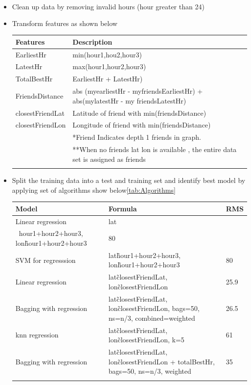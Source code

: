 \begin{itemize}
\item Clean up data by removing invalid hours (hour  greater than 24)
\item Transform features as shown below

\begin{footnotesize}
\begin{tabular}{ll}

\toprule
Features & Description \\
\midrule
EarliestHr & min(hour1,hou2,hour3) \\
LatestHr & max(hour1,hour2,hour3) \\
TotalBestHr & EarliestHr + LatestHr) \\
FriendsDistance & abs (myearliestHr - myfriendsEarliestHr) +  abs(mylatestHr - my friendsLatestHr) \\
closestFriendLat & Latitude of friend with min(friendsDistance) \\
closestFriendLon & Longitude of friend with min(friendsDistance) \\
\midrule
 & \tiny{*Friend Indicates depth 1 friends in graph.}  \\
 & \tiny{**When no friends lat lon is available , the entire data set is assigned as friends} \\
\bottomrule
\label{tab:features}
\end{tabular}
\end{footnotesize}

\item Split the training data into a test and training set and identify best model by applying set of algorithms show below\ref{tab:Algorithms}


\begin{footnotesize}


\begin{tabular}{lll}

\toprule
Model & Formula & RMS \\
\midrule
Linear regression & lat\\~hour1+hour2+hour3, lon\~hour1+hour2+hour3 & 80 \\
SVM for regresssion & lat\~hour1+hour2+hour3, lon\~hour1+hour2+hour3 & 80 \\
Linear regression & lat\~closestFriendLat, lon\~closestFriendLon & 25.9 \\
Bagging with regression & lat\~closestFriendLat, lon\~closestFriendLon, bags=50, ns=n/3, combined=weighted & 26.5 \\
knn regression & lat\~closestFriendLat, lon\~closestFriendLon, k=5 & 61 \\
Bagging with regression & lat\~closestFriendLat, lon\~closestFriendLon + totalBestHr, bags=50, ns=n/3, weighted & 35 \\

\bottomrule

\label{tab:Algorithms}
\end{tabular}


\end{footnotesize}

\end{itemize}

